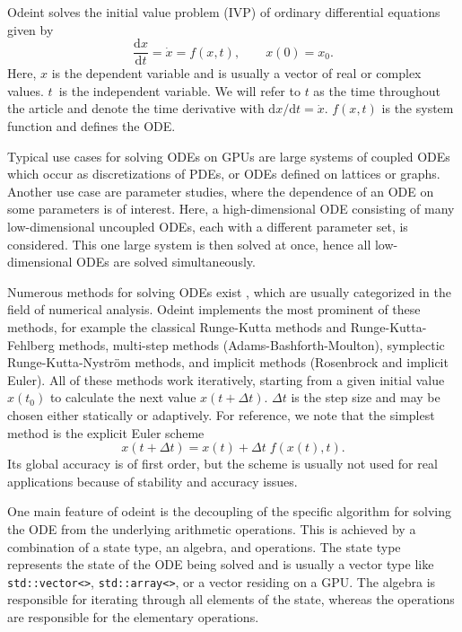 \documentclass[final]{siamltex}
\newcommand{\code}[1]{\lstinline$#1$}
\newcommand {\de} {\mbox{d}}
\begin{document}
Odeint solves the initial value problem (IVP) of ordinary differential
equations given by
\begin{equation}
\frac{\de x}{\de t } = \dot{x} = f(x , t), \quad \quad x(0) = x_0.
\label{eq:ode}
\end{equation}
Here, $x$ is the dependent variable and is usually a vector of real or complex
values.  $t$~is the independent variable. We will refer to $t$ as the time
throughout the article and denote the time derivative with $\de x / \de t =
\dot{x}$. $f(x,t)$ is the system function and defines the ODE.

Typical use cases for solving ODEs on GPUs are large systems of coupled ODEs
which occur as discretizations of PDEs, or ODEs defined on lattices or
graphs. Another use case are parameter studies, where the
dependence of an ODE on some parameters is of interest. Here, a high-dimensional ODE consisting of many low-dimensional
uncoupled ODEs, each with a different parameter set, is
considered. This one large system is then solved at once, hence all
low-dimensional ODEs are solved simultaneously.



Numerous methods for solving ODEs exist \cite{HairerSolvingODEI,
HairerSolvingODEII,Press-92}, which are usually categorized in the field of numerical
analysis.  Odeint implements the most prominent of these methods, for example
the classical Runge-Kutta methods and Runge-Kutta-Fehlberg methods, multi-step
methods (Adams-Bashforth-Moulton), symplectic Runge-Kutta-Nystr\"om methods,
and implicit methods (Rosenbrock and implicit Euler). All of these methods work
iteratively, starting from a given initial value $x(t_0)$ to calculate the next
value $x(t+\Delta t)$.  $\Delta t$ is the step size and may be chosen either
statically or adaptively.  For reference, we note that the simplest method is
the explicit Euler scheme
\begin{equation}
x\left(t+\Delta t\right) = x(t) + \Delta t \; f(x(t),t) .
\label{eq:euler}
\end{equation}
Its global accuracy is of first order, but the scheme is usually not
used for real applications because of stability and accuracy issues.


One main feature of odeint is the decoupling of the specific algorithm
for solving the ODE from the underlying arithmetic operations. This
is achieved by a combination of a state type, an algebra, and
operations. The state type represents the state of the ODE being
solved and is usually a vector type like \code{std::vector<>},
\code{std::array<>}, or a vector residing on a GPU. The algebra is
responsible for iterating through all elements of the state, whereas
the operations are responsible for the elementary operations.
\end{document}
